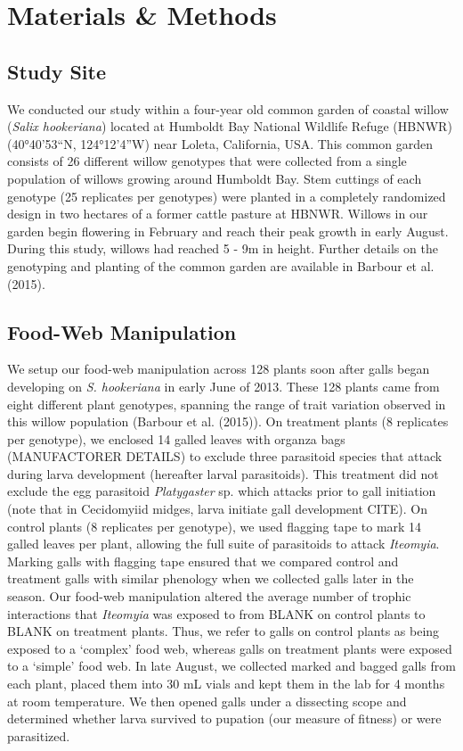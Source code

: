 \documentclass[]{elsarticle} %
\begin{document}
\section{Materials \& Methods}\label{materials-methods}

\subsection{Study Site}\label{study-site}

We conducted our study within a four-year old common garden of coastal
willow (\emph{Salix hookeriana}) located at Humboldt Bay National
Wildlife Refuge (HBNWR) (40°40'53``N, 124°12'4''W) near Loleta,
California, USA. This common garden consists of 26 different willow
genotypes that were collected from a single population of willows
growing around Humboldt Bay. Stem cuttings of each genotype (25
replicates per genotypes) were planted in a completely randomized design
in two hectares of a former cattle pasture at HBNWR. Willows in our
garden begin flowering in February and reach their peak growth in early
August. During this study, willows had reached 5 - 9m in height. Further
details on the genotyping and planting of the common garden are
available in Barbour et al. (2015).

\subsection{Food-Web Manipulation}\label{food-web-manipulation}

We setup our food-web manipulation across 128 plants soon after galls
began developing on \emph{S. hookeriana} in early June of 2013. These
128 plants came from eight different plant genotypes, spanning the range
of trait variation observed in this willow population (Barbour et al.
(2015)). On treatment plants (8 replicates per genotype), we enclosed 14
galled leaves with organza bags (MANUFACTORER DETAILS) to exclude three
parasitoid species that attack during larva development (hereafter
larval parasitoids). This treatment did not exclude the egg parasitoid
\emph{Platygaster} sp. which attacks prior to gall initiation (note that
in Cecidomyiid midges, larva initiate gall development CITE). On control
plants (8 replicates per genotype), we used flagging tape to mark 14
galled leaves per plant, allowing the full suite of parasitoids to
attack \emph{Iteomyia}. Marking galls with flagging tape ensured that we
compared control and treatment galls with similar phenology when we
collected galls later in the season. Our food-web manipulation altered
the average number of trophic interactions that \emph{Iteomyia} was
exposed to from BLANK on control plants to BLANK on treatment plants.
Thus, we refer to galls on control plants as being exposed to a
`complex' food web, whereas galls on treatment plants were exposed to a
`simple' food web. In late August, we collected marked and bagged galls
from each plant, placed them into 30 mL vials and kept them in the lab
for 4 months at room temperature. We then opened galls under a
dissecting scope and determined whether larva survived to pupation (our
measure of fitness) or were parasitized.
\end{document}
